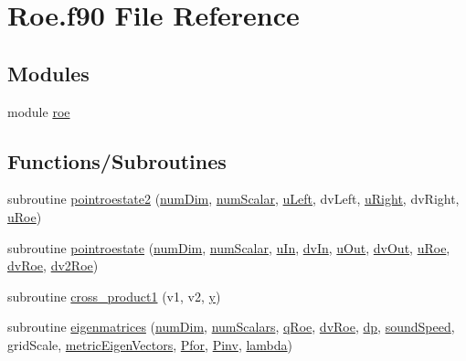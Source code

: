 \hypertarget{Roe_8f90}{}\section{Roe.\+f90 File Reference}
\label{Roe_8f90}
\subsection*{Modules}
\begin{DoxyCompactItemize}
\item 
module \hyperlink{namespaceroe}{roe}
\end{DoxyCompactItemize}
\subsection*{Functions/\+Subroutines}
\begin{DoxyCompactItemize}
\item 
subroutine \hyperlink{namespaceroe_aa40cd6c8eebd973a90987a77c8efa884}{pointroestate2} (\hyperlink{SATKernels_8H_a680185db8546de161968dabace9e94f1}{num\+Dim}, \hyperlink{SATKernels_8H_ac97409f480a745850ce5b215aabef12a}{num\+Scalar}, \hyperlink{RoeKernels_8H_a6d30a232f8df207a0a3655c728f0c396}{u\+Left}, dv\+Left, \hyperlink{RoeKernels_8H_ad7596a27f3010967e23b245f06eadfdd}{u\+Right}, dv\+Right, \hyperlink{RoeKernels_8H_a5624e61551b02c502a36c52d56b2350b}{u\+Roe})
\item 
subroutine \hyperlink{namespaceroe_a98a581399f474ceddad29a35b54824b7}{pointroestate} (\hyperlink{SATKernels_8H_a680185db8546de161968dabace9e94f1}{num\+Dim}, \hyperlink{SATKernels_8H_ac97409f480a745850ce5b215aabef12a}{num\+Scalar}, \hyperlink{RoeKernels_8H_a1b97e89ad96c3195da39163d30857767}{u\+In}, \hyperlink{RoeKernels_8H_a24a50bb7f3155b1d6314eec79d33d669}{dv\+In}, \hyperlink{RoeKernels_8H_aa8ba2167c968e6f2da632acd106b7f88}{u\+Out}, \hyperlink{RoeKernels_8H_ac5fd034bc232848163b16d30e790e8b1}{dv\+Out}, \hyperlink{RoeKernels_8H_a5624e61551b02c502a36c52d56b2350b}{u\+Roe}, \hyperlink{RoeKernels_8H_a642571b2454da1bb84221249e107f82a}{dv\+Roe}, \hyperlink{RoeKernels_8H_a21369091011c3e247805004394055b28}{dv2\+Roe})
\item 
subroutine \hyperlink{namespaceroe_abdb2a52cc70419994c076b8f904a3450}{cross\+\_\+product1} (v1, v2, \hyperlink{SimpleKernels_8H_adbbc84da22c830df0837e7f82eff48d8}{y})
\item 
subroutine \hyperlink{namespaceroe_acb3b55f2bf22c43e91196d4915f7fecb}{eigenmatrices} (\hyperlink{SATKernels_8H_a680185db8546de161968dabace9e94f1}{num\+Dim}, \hyperlink{WENOKernels_8H_a653618c9ce0046e8ef3b30321ea41f98}{num\+Scalars}, \hyperlink{RoeKernels_8H_a1d673d40f8fa40c8e56ed0d69021e9dc}{q\+Roe}, \hyperlink{RoeKernels_8H_a642571b2454da1bb84221249e107f82a}{dv\+Roe}, \hyperlink{RoeKernels_8H_ac12401cc24ddbf8b003a0e6201826e90}{dp}, \hyperlink{RoeKernels_8H_ab66f723f3c3d8399c4428802a1142be0}{sound\+Speed}, grid\+Scale, \hyperlink{RoeKernels_8H_abc719b26d5e9b9d4a4f40ad4261c5f70}{metric\+Eigen\+Vectors}, \hyperlink{RoeKernels_8H_a15dafdc1823a1c1281057d840bfdcda6}{Pfor}, \hyperlink{RoeKernels_8H_a399ec13188834ab2fbeb1b2e02def95d}{Pinv}, \hyperlink{RoeKernels_8H_a89211c91f7e80725e4791ef58e043244}{lambda})

\end{DoxyCompactItemize}
